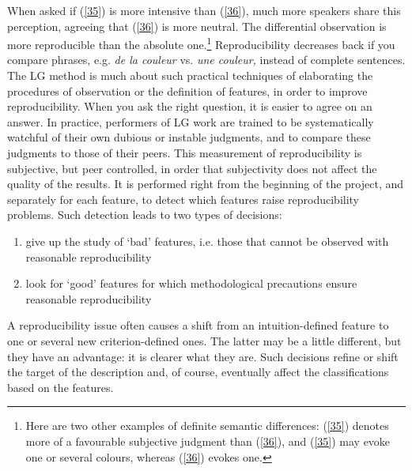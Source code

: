 \documentclass[output=paper]{langsci/langscibook}
\begin{document}
\noindent When asked if (\ref{35}) is more intensive than (\ref{36}), much more speakers share this perception, agreeing that (\ref{36}) is more neutral. The differential observation is more reproducible than the absolute one.\footnote{ Here are two other examples of definite semantic differences: (\ref{35}) denotes more of a favourable subjective judgment than (\ref{36}), and (\ref{35}) may evoke one or several colours, whereas (\ref{36}) evokes one.} Reproducibility decreases back if you compare phrases, e.g. \textit{de la couleur} vs. \textit{une couleur,} instead of complete sentences. The LG method is much about such practical techniques of elaborating the procedures of observation or the definition of features, in order to improve reproducibility. When you ask the right question, it is easier to agree on an answer. In practice, performers of LG work are trained to be systematically watchful of their own dubious or instable judgments, and to compare these judgments to those of their peers. This measurement of reproducibility is subjective, but peer controlled, in order that subjectivity does not affect the quality of the results. It is performed right from the beginning of the project, and separately for each feature, to detect which features raise reproducibility problems. Such detection leads to two types of decisions:

\renewcommand{\theenumi}{(\roman{enumi})}%
\begin{enumerate}
\item give up the study of ‘bad’ features, i.e. those that cannot be observed with reasonable reproducibility
\item look for ‘good’ features for which methodological precautions ensure reasonable reproducibility
\end{enumerate}

\noindent A reproducibility issue often causes a shift from an intuition-defined feature to one or several new criterion-defined ones. The latter may be a little different, but they have an advantage: it is clearer what they are. Such decisions refine or shift the target of the description and, of course, eventually affect the classifications based on the features.
\end{document}
